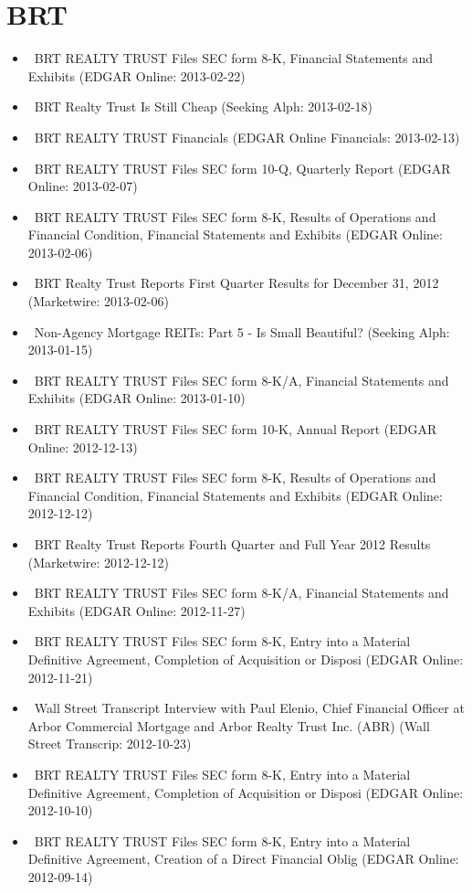 \documentclass[11pt,asymmetric]{article}
\begin{document}
\section*{BRT}
\begin{itemize}
\item\ BRT REALTY TRUST Files SEC form 8-K, Financial Statements and Exhibits (EDGAR Online: 2013-02-22)
\item\ BRT Realty Trust Is Still Cheap (Seeking Alph: 2013-02-18)
\item\ BRT REALTY TRUST Financials (EDGAR Online Financials: 2013-02-13)
\item\ BRT REALTY TRUST Files SEC form 10-Q, Quarterly Report (EDGAR Online: 2013-02-07)
\item\ BRT REALTY TRUST Files SEC form 8-K, Results of Operations and Financial Condition, Financial Statements and Exhibits (EDGAR Online: 2013-02-06)
\item\ BRT Realty Trust Reports First Quarter Results for December 31, 2012 (Marketwire: 2013-02-06)
\item\ Non-Agency Mortgage REITs: Part 5 - Is Small Beautiful? (Seeking Alph: 2013-01-15)
\item\ BRT REALTY TRUST Files SEC form 8-K/A, Financial Statements and Exhibits (EDGAR Online: 2013-01-10)
\item\ BRT REALTY TRUST Files SEC form 10-K, Annual Report (EDGAR Online: 2012-12-13)
\item\ BRT REALTY TRUST Files SEC form 8-K, Results of Operations and Financial Condition, Financial Statements and Exhibits (EDGAR Online: 2012-12-12)
\item\ BRT Realty Trust Reports Fourth Quarter and Full Year 2012 Results (Marketwire: 2012-12-12)
\item\ BRT REALTY TRUST Files SEC form 8-K/A, Financial Statements and Exhibits (EDGAR Online: 2012-11-27)
\item\ BRT REALTY TRUST Files SEC form 8-K, Entry into a Material Definitive Agreement, Completion of Acquisition or Disposi (EDGAR Online: 2012-11-21)
\item\ Wall Street Transcript Interview with Paul Elenio, Chief Financial Officer at Arbor Commercial Mortgage and Arbor Realty Trust Inc. (ABR) (Wall Street Transcrip: 2012-10-23)
\item\ BRT REALTY TRUST Files SEC form 8-K, Entry into a Material Definitive Agreement, Completion of Acquisition or Disposi (EDGAR Online: 2012-10-10)
\item\ BRT REALTY TRUST Files SEC form 8-K, Entry into a Material Definitive Agreement, Creation of a Direct Financial Oblig (EDGAR Online: 2012-09-14)

\end{itemize}
\end{document}
